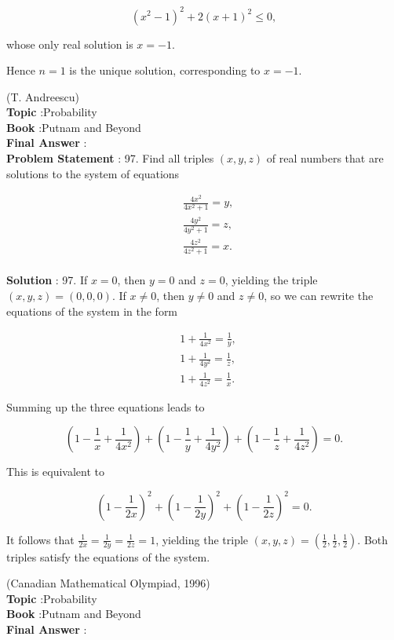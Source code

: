 \documentclass[10pt]{article}
\begin{document}
$$
\left(x^{2}-1\right)^{2}+2(x+1)^{2} \leq 0,
$$

whose only real solution is $x=-1$.

Hence $n=1$ is the unique solution, corresponding to $x=-1$.

(T. Andreescu)
\\
\textbf{Topic} :Probability\\
\textbf{Book} :Putnam and Beyond\\
\textbf{Final Answer} :\\


\textbf{Problem Statement} :
97. Find all triples $(x, y, z)$ of real numbers that are solutions to the system of equations

$$
\begin{aligned}
&\frac{4 x^{2}}{4 x^{2}+1}=y, \\
&\frac{4 y^{2}}{4 y^{2}+1}=z, \\
&\frac{4 z^{2}}{4 z^{2}+1}=x .
\end{aligned}
$$
\\
\textbf{Solution} :
97. If $x=0$, then $y=0$ and $z=0$, yielding the triple $(x, y, z)=(0,0,0)$. If $x \neq 0$, then $y \neq 0$ and $z \neq 0$, so we can rewrite the equations of the system in the form

$$
\begin{aligned}
&1+\frac{1}{4 x^{2}}=\frac{1}{y}, \\
&1+\frac{1}{4 y^{2}}=\frac{1}{z}, \\
&1+\frac{1}{4 z^{2}}=\frac{1}{x} .
\end{aligned}
$$

Summing up the three equations leads to

$$
\left(1-\frac{1}{x}+\frac{1}{4 x^{2}}\right)+\left(1-\frac{1}{y}+\frac{1}{4 y^{2}}\right)+\left(1-\frac{1}{z}+\frac{1}{4 z^{2}}\right)=0 .
$$

This is equivalent to

$$
\left(1-\frac{1}{2 x}\right)^{2}+\left(1-\frac{1}{2 y}\right)^{2}+\left(1-\frac{1}{2 z}\right)^{2}=0 .
$$

It follows that $\frac{1}{2 x}=\frac{1}{2 y}=\frac{1}{2 z}=1$, yielding the triple $(x, y, z)=\left(\frac{1}{2}, \frac{1}{2}, \frac{1}{2}\right)$. Both triples satisfy the equations of the system.

(Canadian Mathematical Olympiad, 1996)
\\
\textbf{Topic} :Probability\\
\textbf{Book} :Putnam and Beyond\\
\textbf{Final Answer} :\\
\end{document}
